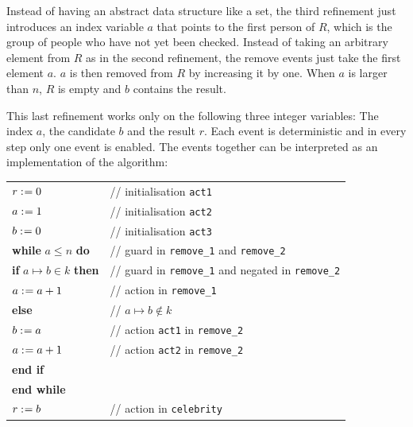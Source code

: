 
Instead of having an abstract data structure like a set, the third refinement just introduces
  an index variable $a$ that points to the first person of $R$, which is the group of people who have not yet been checked.
Instead of taking an arbitrary element from $R$ as in the second refinement, the remove
  events just take the first element $a$. $a$ is then removed from $R$ by increasing
  it by one.
When $a$ is larger than $n$, $R$ is empty and $b$ contains the result.

This last refinement works only on the following three integer variables: 
The index $a$, the candidate $b$ and the result $r$.
Each event is deterministic and in every step only one event is enabled.
The events together can be interpreted as an implementation of the algorithm:
\newline

\begin{tabular}{ll}
  $r \mathrel{:\mkern1mu=} 0$ & // initialisation \texttt{act1} \\
  $a \mathrel{:\mkern1mu=} 1$ & // initialisation \texttt{act2} \\
  $b \mathrel{:\mkern1mu=} 0$ & // initialisation \texttt{act3} \\
  \textbf{while} $a\leq n$ \textbf{do} & // guard in \texttt{remove\_1} and \texttt{remove\_2}\\
  \quad \textbf{if} $a\mapsto b\in k$ \textbf{then} & // guard in \texttt{remove\_1} and negated in \texttt{remove\_2}\\
  \qquad $a \mathrel{:\mkern1mu=} a+1$ & // action in \texttt{remove\_1} \\
  \quad \textbf{else} & // $a\mapsto b\not\in k$\\
  \qquad $b \mathrel{:\mkern1mu=} a$ & // action \texttt{act1} in \texttt{remove\_2} \\
  \qquad $a \mathrel{:\mkern1mu=} a+1$ & // action \texttt{act2} in \texttt{remove\_2} \\
  \quad \textbf{end if} \\
  \textbf{end while} \\
  $r \mathrel{:\mkern1mu=} b$ & // action in \texttt{celebrity}
\end{tabular}

